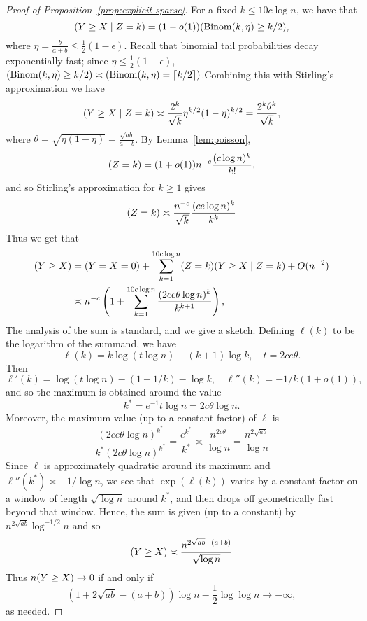 \documentclass[EJP]{ejpecp}
\newcommand{\1}[1]{\mathbbm{1}_{\{#1\}}}
\newcommand{\eps}{\epsilon}
\let\Pr\relax
\DeclareMathOperator{\Pr}{Pr}
\DeclareMathOperator{\Binom}{Binom}
\begin{document}
\begin{proof}[Proof of Proposition~\ref{prop:explicit-sparse}]
For a fixed $k \leq 10 c \log n$, we have that
\[
\Pr(Y \geq X \mid Z = k) = (1-o(1)) \Pr(\Binom(k,\eta) \geq k/2),
\]
where $\eta = \frac{b}{a+b} \le \frac 12 (1-\eps)$.
Recall that binomial tail probabilities decay exponentially fast; since $\eta \le \frac 12 (1-\eps)$,
$\Pr(\Binom(k,\eta) \ge k/2) \asymp \Pr(\Binom(k,\eta) = \lceil k/2 \rceil)$.Combining this
with Stirling's approximation we have
\[
\Pr(Y \geq X \mid Z = k) \asymp \frac{2^k}{\sqrt{k}} \eta^{k/2}(1-\eta)^{k/2} = \frac{2^k \theta^k}{\sqrt{k}},
\]
where $\theta = \sqrt{\eta(1-\eta)} = \frac{\sqrt{a b}}{a+b}$.
By Lemma~\ref{lem:poisson},
\[
\Pr(Z = k) = (1+o(1)) n^{-c} \frac{(c \log n)^k}{k!},
\]
and so Stirling's approximation for $k \ge 1$ gives
\[
\Pr(Z = k) \asymp \frac{n^{-c}}{\sqrt{k}} \frac{(c e \log n)^k}{k^k}
\]
Thus we get that
\begin{align*}
\Pr(Y \geq X) &= \Pr(Y = X = 0) + \sum_{k=1}^{10 c \log n} \Pr(Z = k) \Pr(Y \geq X \mid Z = k) +
O(n^{-2}) \\
& \asymp n^{-c} \left( 1+ \sum_{k=1}^{10 c \log n} \frac{(2 c e \theta \log n)^k}{k^{k+1}} \right),
\end{align*}
The analysis of the sum is standard, and we give a sketch. Defining $\ell(k)$ to be the
logarithm of the summand, we have
\[
\ell(k) = k \log (t \log n) - (k+1) \log k, \quad t = 2 c e \theta.
\]
Then
\[
\ell'(k) = \log (t \log n) - (1+1/k) - \log k, \quad \ell''(k) = -1/k(1+o(1)),
\]
and so the maximum is obtained around the value
\[
k^{\ast} = e^{-1} t \log n = 2 c \theta \log n.
\]
Moreover, the maximum value (up to a constant factor) of $\ell$ is
\[
\frac{(2 c e \theta \log n)^{k^{\ast}}}{k^\ast (2 c \theta \log n)^{k^{\ast}}} =
\frac{e^{k^{\ast}}}{k^{\ast}} \asymp \frac{n^{2c \theta}}{\log n} =
\frac{n^{2\sqrt{ab}}}{\log n}
\]
Since $\ell$ is approximately quadratic around its maximum and $\ell''(k^\ast) \asymp -1/\log n$,
we see that $\exp(\ell(k))$ varies by a constant factor on a window of length $\sqrt{\log n}$
around $k^\ast$, and then drops off geometrically fast beyond that window. Hence, the sum
is given (up to a constant) by $n^{2\sqrt{ab}} \log^{-1/2} n$
and so
\[
  \Pr(Y \ge X) \asymp
  \frac{n^{2\sqrt{ab} - (a+b)}}{\sqrt{\log n}}
\]
Thus $n \Pr(Y \geq X) \to 0$ if and only if
\[
(1+2 \sqrt{ab}-(a+b))\log n - \frac 12 \log \log n \to -\infty,
\]
as needed.
\end{proof}
\end{document}
